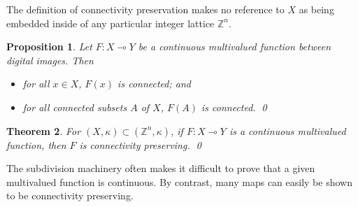 \documentclass{article}
\theoremstyle{plain}
\newtheorem{thm}{Theorem}
\newtheorem{prop}[thm]{Proposition}
\newtheorem{cor}[thm]{Corollary}
\theoremstyle{definition}
\numberwithin{thm}{section}
\def\Z{{\mathbb Z}}
\begin{document}
The definition of connectivity preservation makes no reference to $X$ as being embedded inside of any particular integer lattice $\Z^n$.

\begin{prop}
\label{pt-images-connected}
\rm{\cite{egs08,egs12}}
Let $F:X\multimap Y$ be a continuous multivalued function
between digital images. Then
\begin{itemize}
\item for all $x \in X$, $F(x)$ is connected; and
\item for all connected subsets $A$ of $X$, $F(A)$ is connected.
\qed
\end{itemize}
\end{prop}

\begin{thm}
\label{cont-hierarchy}
\rm{\cite{BoxSta16}}
For $(X,\kappa) \subset (\Z^n,\kappa)$, if $F:X\multimap Y$ 
is a continuous multivalued function, then $F$ is connectivity preserving. \qed
\end{thm}

The subdivision machinery often makes it difficult to prove that a given multivalued function is continuous. By contrast, many maps can easily be shown to be connectivity preserving. 

\begin{comment}
\begin{prop}
\label{1-to-all}
\rm{\cite{BoxSta16}}
Let $X$ and $Y$ be digital images.
Suppose $Y$ is connected. Then the
multivalued function $f: X \multimap Y$ defined by
$f(x)=Y$ for all $x \in X$ is connectivity preserving. \qed
\end{prop}

\begin{prop}
\label{finite-to-infinite}
\rm{\cite{BoxSta16}}
Let $F: X \multimap Y$ be a multivalued
surjection between digital images 
$X,Y\subset (\Z^n, \kappa)$. If $X$ is finite and $Y$
is infinite, then $F$ is not $(\kappa,\kappa)$-continuous. \qed
\end{prop}

\begin{cor}
\rm{\cite{BoxSta16}}
Let $F: X \multimap Y$ be the
multivalued function
between digital images defined by
$F(x)=Y$ for all $x \in X$. If $X$ is finite and $Y$
is infinite and connected, then
$F$ is connectivity preserving but not continuous. \qed
\end{cor}

Examples of connectivity preserving but not continuous multivalued functions on finite spaces are given in \cite{BoxSta16}.
\end{comment}
\end{document}

